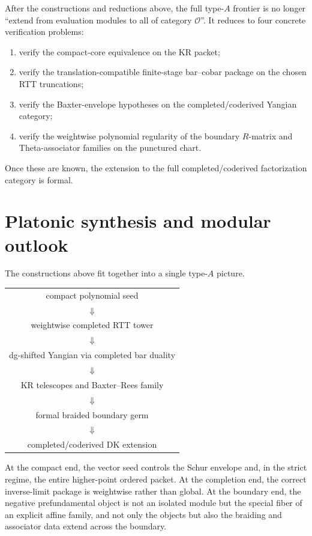 \begin{corollary}
\ClaimStatusProvedHere
\label{cor:what-remains-after-present-appendix}
After the constructions and reductions above, the full type-$A$ frontier
is no longer ``extend from evaluation modules to all of category
$\mathcal O$''. It reduces to four concrete verification problems:
\begin{enumerate}
 \item verify the compact-core equivalence on the KR packet;
 \item verify the translation-compatible finite-stage bar--cobar
 package on the chosen RTT truncations;
 \item verify the Baxter-envelope hypotheses on the completed/coderived
 Yangian category;
 \item verify the weightwise polynomial regularity of the boundary
 $R$-matrix and Theta-associator families on the punctured chart.
\end{enumerate}
Once these are known, the extension to the full completed/coderived
factorization category is formal.
\end{corollary}

\section{Platonic synthesis and modular outlook}
\label{sec:typeA-platonic-synthesis-outlook}

The constructions above fit together into a single type-$A$
picture.

\begin{center}
\begin{tabular}{c}
compact polynomial seed \\
$\Downarrow$ \\
weightwise completed RTT tower \\
$\Downarrow$ \\
dg-shifted Yangian via completed bar duality \\
$\Downarrow$ \\
KR telescopes and Baxter--Rees family \\
$\Downarrow$ \\
formal braided boundary germ \\
$\Downarrow$ \\
completed/coderived DK extension
\end{tabular}
\end{center}

At the compact end, the vector seed controls the Schur envelope and, in
the strict regime, the entire higher-point ordered packet. At the
completion end, the correct inverse-limit package is weightwise rather
than global. At the boundary end, the negative prefundamental object is
not an isolated module but the special fiber of an explicit affine family,
and not only the objects but also the braiding and associator data extend
across the boundary.

